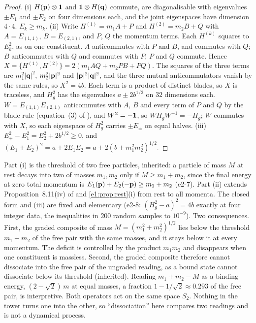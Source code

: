 \begin{proof}
(i) $H(\mathbf p)\otimes\mathbf 1$ and $\mathbf 1\otimes H(\mathbf q)$ commute, are diagonalisable with eigenvalues $\pm E_1$ and $\pm E_2$ on four dimensions each,
and the joint eigenspaces have dimension $4\cdot4$. $E_k\ge m_k$. (ii) Write $H^{(1)}=m_1A+P$ and $H^{(2)}=m_2B+Q$ with $A=E_{(1,1)}$, $B=E_{(2,1)}$,
and $P$, $Q$ the momentum terms. Each $H^{(k)}$ squares to $E_k^2$, as on one constituent. $A$ anticommutes with $P$ and $B$, and commutes with $Q$;
$B$ anticommutes with $Q$ and commutes with $P$; $P$ and $Q$ commute. Hence $X=\{H^{(1)},H^{(2)}\}=2(m_1AQ+m_2PB+PQ)$. The squares of the three
terms are $m_1^2|\mathbf q|^2$, $m_2^2|\mathbf p|^2$ and $|\mathbf p|^2|\mathbf q|^2$, and the three mutual anticommutators vanish by the same rules, so
$X^2=4b$. Each term is a product of distinct blades, so $X$ is traceless, and $H_g^2$ has the eigenvalues $a\pm2b^{1/2}$ on $32$ dimensions
each. $W=E_{(1,1)}E_{(2,1)}$ anticommutes with $A$, $B$ and every term of $P$ and $Q$ by the blade rule (equation~(3) of \cite{ES17}), and
$W^2=-\mathbf 1$, so $WH_gW^{-1}=-H_g$; $W$ commutes with $X$, so each eigenspace of $H_g^2$ carries $\pm E_\pm$ on equal halves. (iii) $E_+^2-E_1^2=E_2^2+2b^{1/2}\ge0$, and $(E_1+E_2)^2=a+2E_1E_2=a+2(b+m_1^2m_2^2)^{1/2}$.
\end{proof}

Part (i) is the threshold of two free particles, inherited: a particle of mass $M$ at rest decays into two of masses $m_1,m_2$ only if
$M\ge m_1+m_2$, since the final energy at zero total momentum is $E_1(\mathbf p)+E_2(-\mathbf p)\ge m_1+m_2$ (e2-7). Part (ii) extends
Proposition~8.11(iv) of \cite{RE} and \cref{e1:prop:rest}(i) from rest to all momenta. The closed form and (iii) are fixed and
elementary (e2-8: $(H_g^2-a)^2=4b$ exactly at four integer data, the inequalities in $200$ random samples to $10^{-9}$). Two consequences.
First, the graded composite of mass $M=(m_1^2+m_2^2)^{1/2}$ lies below the threshold $m_1+m_2$ of the free pair with the same masses, and it
stays below it at every momentum. The deficit is controlled by the product $m_1m_2$ and disappears when one constituent is massless. Second,
the graded composite therefore cannot dissociate into the free pair of the ungraded reading, as a bound state cannot dissociate below its
threshold \cite{BetheSalpeter51} (inherited). Reading $m_1+m_2-M$ as a binding energy, $(2-\sqrt2)\,m$ at equal masses, a fraction
$1-1/\sqrt2\approx0.293$ of the free pair, is interpretive. Both operators act on the same space $S_2$. Nothing in the tower turns one into the
other, so ``dissociation'' here compares two readings and is not a dynamical process.


